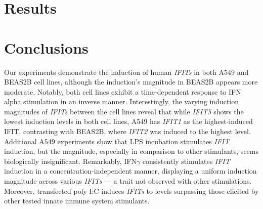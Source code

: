 \section{Results} \label{sec:Results-Chapter 1}


\section{Conclusions} \label{sec:Conclusions Chapter 1}
Our experiments demonstrate the induction of human \textit{IFITs} in both A549 and BEAS2B cell lines, although the induction's magnitude in BEAS2B appears more moderate. Notably, both cell lines exhibit a time-dependent response to IFN alpha stimulation in an inverse manner. Interestingly, the varying induction magnitudes of \textit{IFITs} between the cell lines reveal that while \textit{IFIT5} shows the lowest induction levels in both cell lines, A549 has \textit{IFIT1} as the highest-induced IFIT, contrasting with BEAS2B, where \textit{IFIT2} was induced to the highest level. Additional A549 experiments show that LPS incubation stimulates \textit{IFIT} induction, but the magnitude, especially in comparison to other stimulants, seems biologically insignificant. Remarkably, IFN\(\gamma\) consistently stimulates \textit{IFIT} induction in a concentration-independent manner, displaying a uniform induction magnitude across various \textit{IFITs} — a trait not observed with other stimulations. Moreover, transfected poly I:C induces \textit{IFITs} to levels surpassing those elicited by other tested innate immune system stimulants.


